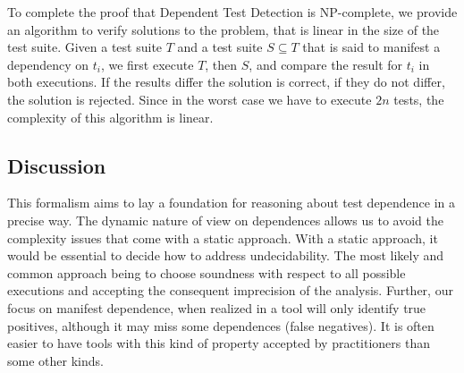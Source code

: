 To complete the proof that Dependent Test Detection is NP-complete, we
provide an algorithm to verify solutions to the problem, that is
linear in the size of the test suite.
Given a test suite $T$ and a test suite $S \subseteq T$ that is said
to manifest a dependency on $t_i$, we first execute $T$, then $S$, and
compare the result for $t_i$ in both executions. 
If the results differ the solution is correct, if they do not differ,
the solution is rejected.
Since in the worst case we have to execute $2n$ tests, the complexity
of this algorithm is linear.



\subsection{Discussion}
\label{sec:formaldiscussion}

This formalism aims to lay a foundation for reasoning about
test dependence in a precise way.
The dynamic nature of view on dependences 
allows us to avoid the complexity issues that come with a static
approach. With a static approach, it would be essential 
to decide how to address undecidability. The most
likely and common approach being to choose soundness with respect to all
possible executions and accepting the consequent imprecision of the analysis.
Further, our focus on manifest dependence, when realized in a tool will
only identify true positives, although it may miss some
dependences (false negatives).  It is often easier to have tools
with this kind of property accepted by practitioners than some other
kinds.  






